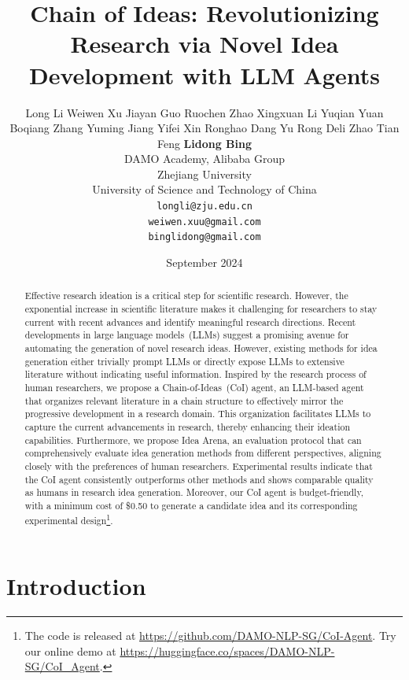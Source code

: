 \documentclass{article}
\title{Chain of Ideas: Revolutionizing Research via Novel Idea Development with LLM Agents}
\author{
Long Li\raisebox{4pt}{\small $1,2,{\thanks{This work was done when Long Li was an intern at Alibaba DAMO Academy}}$} \quad
Weiwen Xu\raisebox{4pt}{\small $1$} \quad
Jiayan Guo\raisebox{4pt}{\small $1$} \quad
Ruochen Zhao\raisebox{4pt}{\small $1$} \quad
Xingxuan Li\raisebox{4pt}{\small $1$} \quad
Yuqian Yuan\raisebox{4pt}{\small $1,2$} \quad
Boqiang Zhang\raisebox{4pt}{\small $1,3$} \quad
Yuming Jiang\raisebox{4pt}{\small $1$} \quad
Yifei Xin\raisebox{4pt}{\small $1$} \quad
Ronghao Dang\raisebox{4pt}{\small $1$} \quad
Yu Rong\raisebox{4pt}{\small $1$} \quad
Deli Zhao\raisebox{4pt}{\small $1$} \quad
Tian Feng\raisebox{4pt}{\small $2$} \quad
\textbf{Lidong Bing}\raisebox{4pt}{\small $1,\thanks{Lidong Bing is the corresponding author}$} \\
\raisebox{4pt}{\small $1$}DAMO Academy, Alibaba Group \\
\raisebox{4pt}{\small $2$}Zhejiang University \\
\raisebox{4pt}{\small $3$}University of Science and Technology of China \\
{\tt longli@zju.edu.cn} \\
{\tt weiwen.xuu@gmail.com} \\
{\tt binglidong@gmail.com}
}
\date{September 2024}
\newcommand{\orange}[1]{\textcolor{orange}{#1}}
\newcommand{\bing}[1]{\textcolor{brown}{[Bing: #1]}}
\newcommand{\xww}[1]{\textcolor{blue}{[xww: #1]}}
\newcommand{\gjy}[1]{\textcolor{green}{[gjy: #1]}}
\newcommand{\cchar}[1]{\begin{CJK*}{UTF8}{gkai}#1\end{CJK*}}
\newcommand{\bingc}[1]{\textcolor{brown}{[\textbf{BING:} \cchar{#1}]}}
\begin{document}
\maketitle

\begin{abstract}

Effective research ideation is a critical step for scientific research. However, the exponential increase in scientific literature makes it challenging for researchers to stay current with recent advances and identify meaningful research directions. Recent developments in large language models~(LLMs) suggest a promising avenue for automating the generation of novel research ideas. However, existing methods for idea generation either trivially prompt LLMs or directly expose LLMs to extensive literature without indicating useful information. 
Inspired by the research process of human researchers, we propose a Chain-of-Ideas~(CoI) agent, an LLM-based agent that organizes relevant literature in a chain structure to effectively mirror the progressive development in a research domain.
This organization facilitates LLMs to capture the current advancements in research, thereby enhancing their ideation capabilities.
Furthermore, we propose Idea Arena, an evaluation protocol that can comprehensively evaluate idea generation methods from different perspectives, aligning closely with the preferences of human researchers.
Experimental results indicate that the CoI agent consistently outperforms other methods and shows comparable quality as humans in research idea generation. 
Moreover, our CoI agent is budget-friendly, with a minimum cost of \$0.50 to generate a candidate idea and its corresponding experimental design\footnote{The code is released at \url{https://github.com/DAMO-NLP-SG/CoI-Agent}. Try our online demo at \url{https://huggingface.co/spaces/DAMO-NLP-SG/CoI_Agent}.}.

\end{abstract}






\section{Introduction}
\end{document}
